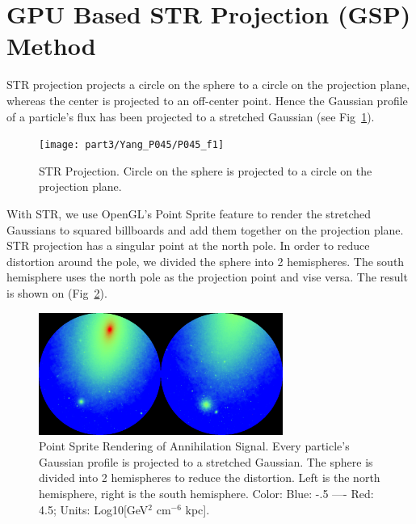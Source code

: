 \section{GPU Based STR Projection (GSP) Method}
STR projection projects a circle on the sphere to a circle on the projection plane, whereas the center is projected to an off-center point. Hence the Gaussian profile of a particle's flux has been projected to a stretched Gaussian (see Fig~\ref{figstr}). 

\begin{figure}[htb]
\begin{center}
 \texttt{[image: part3/Yang\_P045/P045\_f1]}
\caption{STR Projection. Circle on the sphere is projected to a circle on the projection plane.\label{figstr}}
\end{center}
\end{figure}

With STR, we use OpenGL's Point Sprite feature to render the stretched Gaussians to squared billboards and add them together on the projection plane. STR projection has a singular point at the north pole. In order to reduce distortion around the pole, we divided the  sphere into 2 hemispheres. The south hemisphere uses the north pole as the projection point and vise versa. The result is shown on (Fig~\ref{figsky}).

\begin{figure}[htb]
\begin{center}
 \includegraphics[width=80mm]{part3/Yang_P045/P045_f2}
\caption{ Point Sprite Rendering of Annihilation Signal. Every particle's Gaussian profile is projected to a stretched Gaussian. The sphere is divided into 2 hemispheres to reduce the distortion. Left is the north hemisphere, right is the south hemisphere. Color: Blue: -.5 ---- Red: 4.5;  Units: Log10[GeV$^2$ cm$^{-6}$ kpc].\label{figsky}}
\end{center}
\end{figure}


